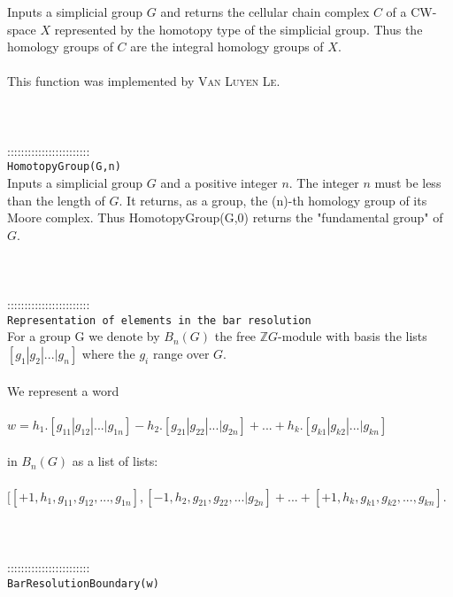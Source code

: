 \documentclass[a4paper,11pt]{report}
\begin{document}
{ Inputs a simplicial group $G$ and returns the cellular chain complex $C$ of a CW-space $X$ represented by the homotopy type of the simplicial group. Thus the homology
groups of $C$ are the integral homology groups of $X$. \\
 \\
 This function was implemented by \textsc{Van Luyen Le}. \\
 \\
 \\
 \\
 ::::::::::::::::::::::::\\
 \texttt{HomotopyGroup(G,n)}\\
 

 Inputs a simplicial group $G$ and a positive integer $n$. The integer $n$ must be less than the length of $G$. It returns, as a group, the (n)-th homology group of its Moore complex. Thus
HomotopyGroup(G,0) returns the "fundamental group" of $G$. \\
 \\
 \\
 \\
 ::::::::::::::::::::::::\\
 \texttt{Representation of elements in the bar resolution}\\
 

 For a group G we denote by $B_n(G)$ the free $\mathbb ZG$-module with basis the lists $[g_1 | g_2 | ... | g_n]$ where the $g_i$ range over $G$. \\
 \\
 We represent a word \\
 \\
 $w = h_1.[g_{11} | g_{12} | ... | g_{1n}] - h_2.[g_{21} | g_{22} | ... |
g_{2n}] + ... + h_k.[g_{k1} | g_{k2} | ... | g_{kn}] $ \\
 \\
 in $B_n(G)$ as a list of lists: \\
 \\
 $ [ [+1,h_1,g_{11} , g_{12} , ... , g_{1n}] , [-1, h_2,g_{21} , g_{22} , ... |
g_{2n}] + ... + [+1, h_k,g_{k1} , g_{k2} , ... , g_{kn}] $. \\
 \\
 \\
 \\
 ::::::::::::::::::::::::\\
 \texttt{BarResolutionBoundary(w)}\\
 

}
\end{document}
